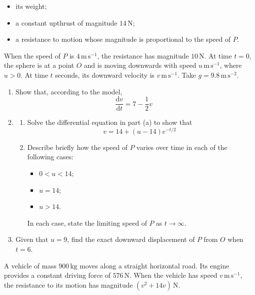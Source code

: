 \documentclass[leqno]{article}
\begin{document}
\begin{enumerate}[
  label=\textbf{\arabic*.},
  leftmargin=*,
  topsep=0pt,
  partopsep=0pt,
  parsep=0pt
]
\begin{itemize}
  \item its weight;
  \item a constant upthrust of magnitude $14\,\mathrm{N}$;
  \item a resistance to motion whose magnitude is proportional to the speed of $P$.
\end{itemize}

When the speed of $P$ is $4\,\mathrm{m\,s^{-1}}$, the resistance has magnitude $10\,\mathrm{N}$. At time $t=0$, the sphere is at a point $O$ and is moving downwards with speed $u\,\mathrm{m\,s^{-1}}$, where $u>0$. At time $t$ seconds, its downward velocity is $v\,\mathrm{m\,s^{-1}}$. Take $g=9.8\,\mathrm{m\,s^{-2}}$. \\

\begin{enumerate}[label=\textbf{(\alph*)}]
  \item Show that, according to the model,
  \[
  \dfrac{\mathrm{d}v}{\mathrm{d}t}=7-\dfrac{1}{2}v
  \]
  \item
  \begin{enumerate}[label=(\roman*)]
    \item Solve the differential equation in part (a) to show that
    \[
    v=14+(u-14)e^{-t/2}
    \]
    \item Describe briefly how the speed of $P$ varies over time in each of the following cases:
    \begin{itemize}
      \item $0<u<14$;
      \item $u=14$;
      \item $u>14$.
    \end{itemize}
    In each case, state the limiting speed of $P$ as $t\to\infty$.  \\
  \end{enumerate}
  \item Given that $u=9$, find the exact downward displacement of $P$ from $O$ when $t=6$.  \\
\end{enumerate}

\newpage

\questionitem

A vehicle of mass $900\,\mathrm{kg}$ moves along a straight horizontal road. Its engine provides a constant driving force of $576\,\mathrm{N}$. When the vehicle has speed $v\,\mathrm{m\,s^{-1}}$, the resistance to its motion has magnitude $(v^2+14v)\,\mathrm{N}$. \\


\end{enumerate}
\end{document}

